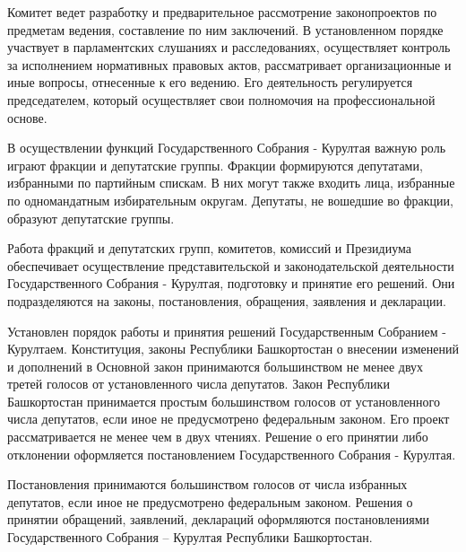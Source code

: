 Комитет ведет разработку и предварительное рассмотрение законопроектов по предметам ведения, составление по ним заключений. В установленном порядке участвует в парламентских слушаниях и расследованиях, осуществляет контроль за исполнением нормативных правовых актов, рассматривает организационные и иные вопросы, отнесенные к его ведению. Его деятельность регулируется председателем, который осуществляет свои полномочия на профессиональной основе.

В осуществлении функций Государственного Собрания - Курултая важную роль играют фракции и депутатские группы. Фракции формируются депутатами, избранными по партийным спискам. В них могут также входить лица, избранные по одномандатным избирательным округам. Депутаты, не вошедшие во фракции, образуют депутатские группы.

Работа фракций и депутатских групп, комитетов, комиссий и Президиума обеспечивает осуществление представительской и законодательской деятельности Государственного Собрания - Курултая, подготовку и принятие его решений. Они подразделяются на законы, постановления, обращения, заявления и декларации.

Установлен порядок работы и принятия решений Государственным Собранием - Курултаем. Конституция, законы Республики Башкортостан о внесении изменений и дополнений в Основной закон принимаются большинством не менее двух третей голосов от установленного числа депутатов. Закон Республики Башкортостан принимается простым большинством голосов от установленного числа депутатов, если иное не предусмотрено федеральным законом. Его проект рассматривается не менее чем в двух чтениях. Решение о его принятии либо отклонении оформляется постановлением Государственного Собрания - Курултая.

Постановления принимаются большинством голосов от числа избранных депутатов, если иное не предусмотрено федеральным законом. Решения о принятии обращений, заявлений, деклараций оформляются постановлениями Государственного Собрания – Курултая Республики Башкортостан.


